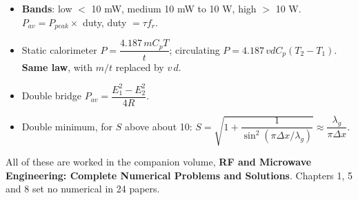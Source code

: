 \begin{itemize}
  \item \textbf{Bands}: low $<$ 10 mW, medium 10 mW to 10 W, high $>$ 10 W. $P_{av} =
    P_{peak}\times$ duty, duty $=\tau f_r$.
  \item Static calorimeter $P = \dfrac{4.187\,mC_pT}{t}$; circulating
    $P = 4.187\,vdC_p(T_2-T_1)$. \textbf{Same law}, with $m/t$ replaced by $v\,d$.
  \item Double bridge $P_{av} = \dfrac{E_1^2 - E_2^2}{4R}$.
  \item Double minimum, for $S$ above about 10:
    $S = \sqrt{1 + \dfrac{1}{\sin^2(\pi\Delta x/\lambda_g)}} \approx
    \dfrac{\lambda_g}{\pi\Delta x}$.
\end{itemize}

\par{}\vspace{4pt}


{\color{sub}\footnotesize All of these are worked in the companion volume,
\textbf{RF and Microwave Engineering: Complete Numerical Problems and Solutions}. Chapters
1, 5 and 8 set no numerical in 24 papers.}

